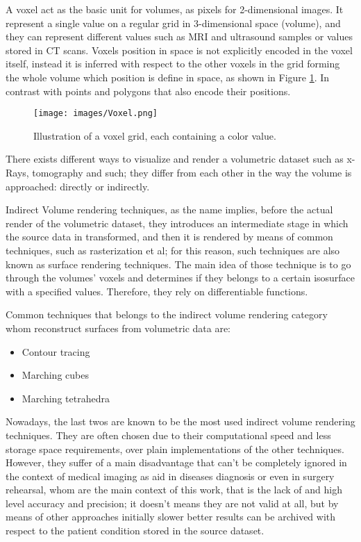 \documentclass[12pt,a4paper]{extarticle}
\newcommand{\linespace}{\vspace{8pt}}
\begin{document}
A voxel act as the basic unit for volumes, as pixels for 2-dimensional images.
It represent a single value on a regular grid in 3-dimensional space (volume), and they can represent different values such as MRI and ultrasound samples or values stored in CT scans. Voxels position in space is not explicitly encoded in the voxel itself, instead it is inferred with respect to the other voxels in the grid forming the whole volume which position is define in space, as shown in Figure \ref{fig:voxel}. In contrast with points and polygons that also encode their positions. %

\begin{figure}[hbtp]
\centering
\texttt{[image: images/Voxel.png]}
\caption{Illustration of a voxel grid, each containing a color value.}
\label{fig:voxel}
\end{figure}

There exists different ways to visualize and render a volumetric dataset such as x-Rays, tomography and such; they differ from each other in the way the volume is approached: directly or indirectly.
\linespace

Indirect Volume rendering techniques, as the name implies, before the actual render of the volumetric dataset, they introduces an intermediate stage in which the source data in transformed, and then it is rendered by means of common techniques, such as rasterization et al; for this reason, such techniques are also known as surface rendering techniques.
The main idea of those technique is to go through the volumes' voxels and determines if they belongs to a certain isosurface with a specified values. Therefore, they rely on differentiable functions.


Common techniques that belongs to the indirect volume rendering category whom reconstruct surfaces from volumetric data are:
\begin{itemize}
\item Contour tracing
\item Marching cubes
\item Marching tetrahedra
\end{itemize}

Nowadays, the last twos are known to be the most used indirect volume rendering techniques.
They are often chosen due to their computational speed %
and less storage space requirements, over plain implementations of the other techniques. However, they suffer of a main disadvantage that can't be completely ignored in the context of medical imaging as aid in diseases diagnosis or even in surgery rehearsal, whom are the main context of this work, that is the lack of and high level accuracy and precision; it doesn't means they are not valid at all, but by means of other approaches initially slower better results can be archived with respect to the patient condition stored in the source dataset.  
\end{document}
